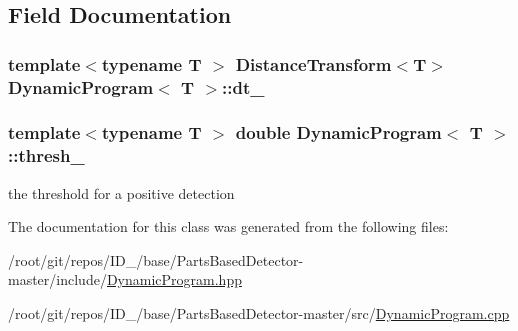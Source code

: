 \subsection{\-Field \-Documentation}
\hypertarget{classDynamicProgram_a6cea0b8559d6a03d81e2003991ab67cf}{
\subsubsection[{dt\-\_\-}]{\setlength{\rightskip}{0pt plus 5cm}template$<$typename T $>$ {\bf \-Distance\-Transform}$<$\-T$>$ {\bf \-Dynamic\-Program}$<$ \-T $>$\-::{\bf dt\-\_\-}}}\label{classDynamicProgram_a6cea0b8559d6a03d81e2003991ab67cf}
\hypertarget{classDynamicProgram_a08f2d4801faa0f964e217b9ac9927ec6}{
\subsubsection[{thresh\-\_\-}]{\setlength{\rightskip}{0pt plus 5cm}template$<$typename T $>$ double {\bf \-Dynamic\-Program}$<$ \-T $>$\-::{\bf thresh\-\_\-}}}\label{classDynamicProgram_a08f2d4801faa0f964e217b9ac9927ec6}


the threshold for a positive detection 



\-The documentation for this class was generated from the following files\-:\begin{DoxyCompactItemize}
\item 
/root/git/repos/\-I\-D\-\_/base/\-Parts\-Based\-Detector-\/master/include/\hyperlink{DynamicProgram_8hpp}{\-Dynamic\-Program.\-hpp}\item 
/root/git/repos/\-I\-D\-\_/base/\-Parts\-Based\-Detector-\/master/src/\hyperlink{DynamicProgram_8cpp}{\-Dynamic\-Program.\-cpp}\end{DoxyCompactItemize}
